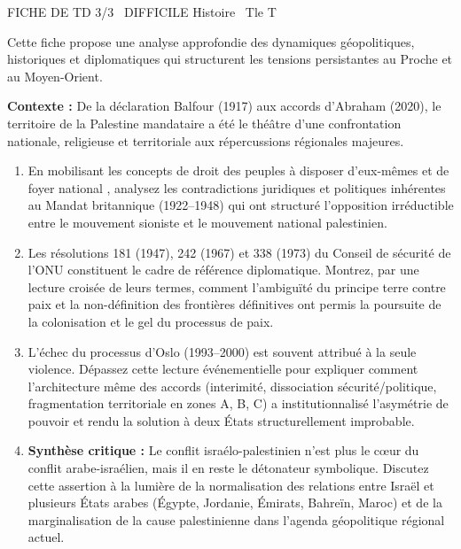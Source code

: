 \documentclass[11pt]{article}
\begin{document}
\begin{tcolorbox}[enhanced,colback=popink,colframe=popink,arc=10pt,boxrule=0pt,left=12pt,right=12pt,top=9pt,bottom=9pt]
{\color{white}\popxbold\small FICHE DE TD 3/3 \textbullet\ DIFFICILE \hfill Histoire \textbullet\ Tle T\par}
\end{tcolorbox}
\vspace{4pt}
Cette fiche propose une analyse approfondie des dynamiques géopolitiques, historiques et diplomatiques qui structurent les tensions persistantes au Proche et au Moyen-Orient.

\begin{exercice}
\textbf{Contexte :} De la déclaration Balfour (1917) aux accords d'Abraham (2020), le territoire de la Palestine mandataire a été le théâtre d'une confrontation nationale, religieuse et territoriale aux répercussions régionales majeures.

\begin{enumerate}
    \item En mobilisant les concepts de \og droit des peuples à disposer d'eux-mêmes \fg{} et de \og foyer national \fg{}, analysez les contradictions juridiques et politiques inhérentes au Mandat britannique (1922--1948) qui ont structuré l'opposition irréductible entre le mouvement sioniste et le mouvement national palestinien.
    \item Les résolutions 181 (1947), 242 (1967) et 338 (1973) du Conseil de sécurité de l'ONU constituent le \og cadre de référence \fg{} diplomatique. Montrez, par une lecture croisée de leurs termes, comment l'ambiguïté du principe \og terre contre paix \fg{} et la non-définition des frontières définitives ont permis la poursuite de la colonisation et le gel du processus de paix.
    \item L'échec du processus d'Oslo (1993--2000) est souvent attribué à la seule violence. Dépassez cette lecture événementielle pour expliquer comment l'architecture même des accords (interimité, dissociation sécurité/politique, fragmentation territoriale en zones A, B, C) a institutionnalisé l'asymétrie de pouvoir et rendu la solution à deux États structurellement improbable.
    \item \textbf{Synthèse critique :} \og Le conflit israélo-palestinien n'est plus le cœur du conflit arabe-israélien, mais il en reste le détonateur symbolique. \fg{} Discutez cette assertion à la lumière de la normalisation des relations entre Israël et plusieurs États arabes (Égypte, Jordanie, Émirats, Bahreïn, Maroc) et de la marginalisation de la cause palestinienne dans l'agenda géopolitique régional actuel.
\end{enumerate}
\end{exercice}
\end{document}

